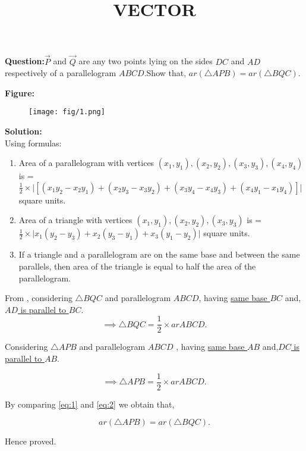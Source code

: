 \documentclass[12pt]{article}
\begin{document}
\title{\textbf{VECTOR}}
\date{}
\maketitle
\textbf{Question:}$\vec{P}$ and $\vec{Q}$ are any two points lying on the sides $DC$ and $AD$ respectively of a parallelogram $ABCD$.Show that, $ar(\triangle APB)=ar(\triangle BQC)$.


\textbf{Figure:}
\begin{figure}[H]
    \centering
    \texttt{[image: fig/1.png]}
    \caption{}
    \label{fig:fig:1}
\end{figure}


\textbf{Solution:}\\
Using formulas: \begin{enumerate}
\item Area of a parallelogram with  vertices $(x_1,y_1),(x_2,y_2),(x_3,y_3),(x_4,y_4)$ is =  $\frac{1}{2}\times \big |[(x_1y_2-x_2y_1)+(x_2y_3-x_3y_2)+(x_3y_4-x_4y_3)+(x_4y_1-x_1y_4)] \big|$ square units.
\item Area of a triangle with vertices $(x_1,y_1),(x_2,y_2),(x_3,y_3)$ is =  $\frac{1}{2}\times \big |x_1(y_2-y_3)+x_2(y_3-y_1)+x_3(y_1-y_2) \big|$ square units.

\item If a triangle and a parallelogram are on the same base and between the same parallels, then area of the triangle is equal to half the area of the parallelogram.

\end{enumerate}
From  ,
considering $\triangle BQC$ and parallelogram $ ABCD$, having \underline{same base $BC$} and, \underline{$AD$ is parallel to $BC$}.\\

\begin{equation}
\implies \triangle BQC = \frac{1}{2}\times ar ABCD.
 \label{eq:eq:1}
\end{equation}

Considering $\triangle APB$ and parallelogram $ABCD$ , having \underline{same base $AB$} and,\underline{$DC$ is parallel to $AB$}.

\begin{equation}
\implies \triangle APB = \frac{1}{2}\times ar ABCD.
 \label{eq:eq:2}
\end{equation}

By comparing \eqref{eq:1} and \eqref{eq:2} we obtain that,

\begin{equation}
    ar(\triangle APB) =  ar(\triangle BQC).
\end{equation}
\begin{center}
 Hence proved.

\end{center}
\end{document}
